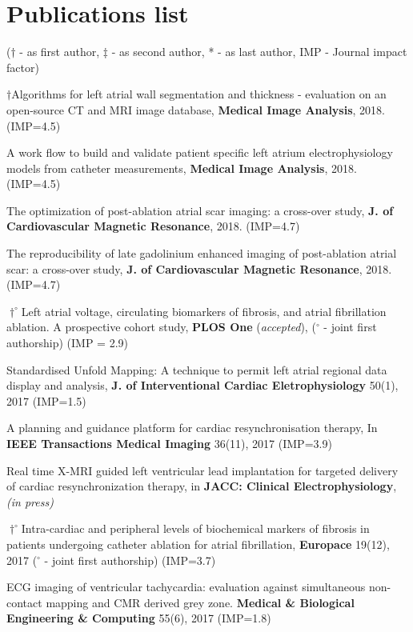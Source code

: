 \renewcommand{\theenumi}{J\arabic{enumi}}
\section{Publications list}
($\dagger$ - as first author, $\ddagger$ - as second author, * - as last author, IMP - Journal impact factor)\\[2mm]
\begin{etaremune}
\item $\dagger$Algorithms for left atrial wall segmentation and thickness - evaluation on an open-source CT and MRI image database, \textbf{Medical Image Analysis}, 2018. (IMP=4.5)
\item A work flow to build and validate patient specific left atrium electrophysiology models from catheter measurements, \textbf{Medical Image Analysis}, 2018. (IMP=4.5)
\item The optimization of post-ablation atrial scar imaging: a cross-over study, \textbf{J. of Cardiovascular Magnetic Resonance}, 2018. (IMP=4.7)
\item The reproducibility of late gadolinium enhanced imaging of post-ablation atrial scar: a cross-over study, \textbf{J. of Cardiovascular Magnetic Resonance}, 2018. (IMP=4.7)
\item $\dagger^\circ$Left atrial voltage, circulating biomarkers of fibrosis, and atrial fibrillation ablation. A prospective cohort study, \textbf{PLOS One} (\textit{accepted}), ($^\circ$ - joint first authorship) (IMP = 2.9)
\item Standardised Unfold Mapping: A technique to permit left atrial regional data display and analysis, \textbf{J. of Interventional Cardiac Eletrophysiology}  50(1), 2017 (IMP=1.5)
\item A planning and guidance platform for cardiac resynchronisation therapy, In \textbf{IEEE Transactions Medical Imaging} 36(11), 2017 (IMP=3.9)
\item Real time X-MRI guided left ventricular lead implantation for targeted delivery of cardiac resynchronization therapy, in \textbf{JACC: Clinical Electrophysiology}, \textit{(in press)}
\item $\dagger^\circ$Intra-cardiac and peripheral levels of biochemical markers of fibrosis in patients undergoing catheter ablation for atrial fibrillation, \textbf{Europace} 19(12), 2017 ($^\circ$ - joint first authorship) (IMP=3.7)
\item ECG imaging of ventricular tachycardia: evaluation against simultaneous non-contact mapping and CMR derived grey zone. \textbf{Medical \& Biological Engineering \& Computing} 55(6), 2017 (IMP=1.8)

\end{etaremune}
